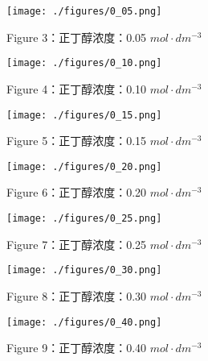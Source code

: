 \documentclass[4pt,a4papper]{article}
\begin{document}
	\begin{figure}[htbp]
        \centering
        \texttt{[image: ./figures/0\_05.png]}
        \caption{Figure 3：正丁醇浓度：0.05 $mol·dm^{-3}$} \label{fig:3}
    \end{figure}

	\begin{figure}[htbp]
        \centering
        \texttt{[image: ./figures/0\_10.png]}
        \caption{Figure 4：正丁醇浓度：0.10 $mol·dm^{-3}$} \label{fig:4}
    \end{figure}

    \begin{figure}[htbp]
        \centering
        \texttt{[image: ./figures/0\_15.png]}
        \caption{Figure 5：正丁醇浓度：0.15 $mol·dm^{-3}$} \label{fig:5}
    \end{figure}

    \begin{figure}[htbp]
        \centering
        \texttt{[image: ./figures/0\_20.png]}
        \caption{Figure 6：正丁醇浓度：0.20 $mol·dm^{-3}$} \label{fig:6}
    \end{figure}

    \begin{figure}[htbp]
        \centering
        \texttt{[image: ./figures/0\_25.png]}
        \caption{Figure 7：正丁醇浓度：0.25 $mol·dm^{-3}$} \label{fig:7}
    \end{figure}

    \begin{figure}[htbp]
        \centering
        \texttt{[image: ./figures/0\_30.png]}
        \caption{Figure 8：正丁醇浓度：0.30 $mol·dm^{-3}$} \label{fig:8}
    \end{figure}

    \begin{figure}[htbp]
        \centering
        \texttt{[image: ./figures/0\_40.png]}
        \caption{Figure 9：正丁醇浓度：0.40 $mol·dm^{-3}$} \label{fig:9}
    \end{figure}
\newpage
\end{document}
